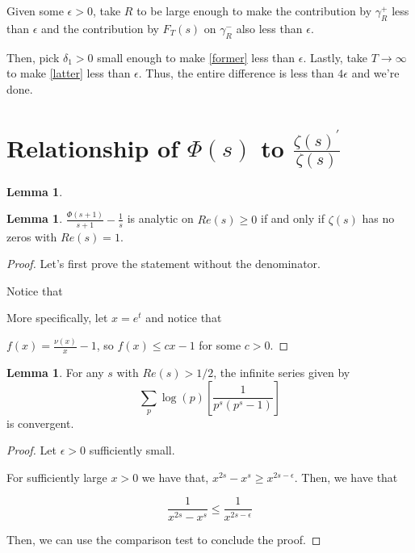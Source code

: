 \documentclass{article}
\theoremstyle{definition}
\newtheorem{lemma}[theorem]{Lemma}
\begin{document}
Given some $ \epsilon > 0 $, take $ R $ to be large enough to make the
contribution by $ \gamma_{R}^{+} $ less than $ \epsilon $ and the contribution
by $ F_{T}(s) $ on $ \gamma_{R}^{-} $ also less than $ \epsilon $.

Then, pick $ \delta_{1} > 0 $ small enough to make \ref{former} less than $ \epsilon $.
Lastly, take $ T \to \infty $ to make \ref{latter} less than $ \epsilon $.
Thus, the entire difference is less than $ 4 \epsilon $ and we're done.


\section{Relationship of $ \Phi(s) $ to $ \frac{\zeta(s)^{\prime}}{\zeta(s)}$}

\begin{lemma}\label{lem:newman_v}

\end{lemma}



\begin{lemma}\label{lem:newman_v_conditions}
    $ \frac{\Phi(s + 1)}{s + 1} - \frac{1}{s} $ is analytic on 
    $ Re(s) \geq 0 $ if and only if $ \zeta(s) $ has no zeros
    with $ Re(s) = 1 $.
\end{lemma}
\begin{proof}
    Let's first prove the statement without the denominator.

    Notice that


    
    More specifically, let $ x = e^{t} $
    and notice that 
    
    $ f(x) = \frac{\nu(x)}{x} - 1 $, so $ f(x) \leq cx - 1 $ for some $ c > 0 $.
\end{proof}

\begin{lemma}\label{lem:epsilon_convergence_trick_phi}
    For any $ s $ with $ Re(s) > 1/2 $, the infinite series given by 
    \[ \sum_{p} \log(p)[\frac{1}{p^{s}(p^{s} - 1)}] \] 
    is convergent.
\end{lemma}
\begin{proof}
    
    Let $ \epsilon > 0 $ sufficiently small.

    For sufficiently large $ x > 0 $ we have that, $ x^{2s} - x^{s} \geq x^{2s - \epsilon} $.
    Then, we have that
    
    \[ \frac{1}{x^{2s} - x^{s}} \leq \frac{1}{x^{2s - \epsilon}} \]

    Then, we can use the comparison test to conclude the proof.
\end{proof}
\end{document}
